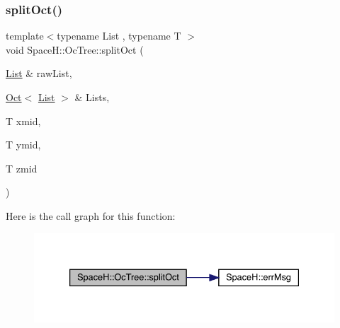 \subsubsection{\texorpdfstring{split\+Oct()}{splitOct()}}
{\footnotesize\ttfamily template$<$typename List , typename T $>$ \\
void Space\+H\+::\+Oc\+Tree\+::split\+Oct (\begin{DoxyParamCaption}\item[{\mbox{\hyperlink{struct_space_h_1_1_oc_tree_1_1_list}{List}} \&}]{raw\+List,  }\item[{\mbox{\hyperlink{struct_space_h_1_1_oc_tree_1_1_oct}{Oct}}$<$ \mbox{\hyperlink{struct_space_h_1_1_oc_tree_1_1_list}{List}} $>$ \&}]{Lists,  }\item[{T}]{xmid,  }\item[{T}]{ymid,  }\item[{T}]{zmid }\end{DoxyParamCaption})}

Here is the call graph for this function\+:
\nopagebreak
\begin{figure}[H]
\begin{center}
\leavevmode
\includegraphics[width=333pt]{namespace_space_h_1_1_oc_tree_af27f1253cb5f80c85149b2ccbc2b6f0b_cgraph}
\end{center}
\end{figure}
